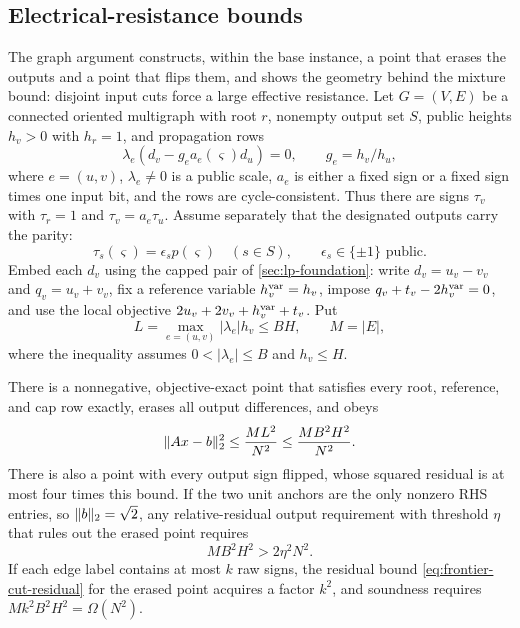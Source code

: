 \subsection{Electrical-resistance bounds}
\label{sec:frontier-electrical}

The graph argument constructs, within the base instance, a point that
erases the outputs and a point that flips them, and shows the geometry behind the mixture bound: disjoint input
cuts force a large effective resistance.  Let
\(G=(V,E)\) be a connected oriented multigraph with root \(r\), nonempty
output set \(S\), public heights \(h_v>0\) with \(h_r=1\), and propagation
rows
\begin{equation}
 \lambda_e(d_v-g_ea_e(\varsigma)d_u)=0,
 \qquad g_e=h_v/h_u,
 \label{eq:frontier-signed-edge}
\end{equation}
where \(e=(u,v)\), \(\lambda_e\neq0\) is a public scale, \(a_e\) is either a
fixed sign or a fixed sign times one input bit, and the rows are
cycle-consistent.  Thus there are signs \(\tau_v\) with
\(\tau_r=1\) and \(\tau_v=a_e\tau_u\).  Assume separately that the
designated outputs carry the parity:
\begin{equation}
 \tau_s(\varsigma)=\epsilon_s p(\varsigma)
 \quad(s\in S),\qquad \epsilon_s\in\{\pm1\}\text{ public}.
 \label{eq:frontier-cut-output-parity}
\end{equation}
Embed each \(d_v\) using the capped pair of
\cref{sec:lp-foundation}: write \(d_v=u_v-v_v\) and
\(q_v=u_v+v_v\), fix a reference variable \(h_v^{\rm var}=h_v\), impose
\(q_v+t_v-2h_v^{\rm var}=0\), and use the local objective
\(2u_v+2v_v+h_v^{\rm var}+t_v\).  Put
\[
 L=\max_{e=(u,v)}|\lambda_e|h_v\leq BH,
 \qquad M=|E|,
\]
where the inequality assumes \(0<|\lambda_e|\leq B\) and \(h_v\leq H\).

\begin{theorem}
\label{thm:frontier-cut-resistance}
There is a nonnegative, objective-exact point that satisfies every root,
reference, and cap row exactly, erases all output differences, and obeys
\begin{equation}
 \lVert Ax-b\rVert_2^2\leq\frac{ML^2}{N^2}
 \leq\frac{MB^2H^2}{N^2}.
 \label{eq:frontier-cut-residual}
\end{equation}
There is also a point with every output sign flipped, whose squared residual
is at most four times this bound.  If the two unit anchors are the only
nonzero RHS entries, so \(\lVert b\rVert_2=\sqrt2\), any relative-residual output requirement
with threshold \(\eta\) that rules out the erased point requires
\begin{equation}
 MB^2H^2>2\eta^2N^2.
 \label{eq:frontier-cut-product}
\end{equation}
If each edge label contains at most \(k\) raw signs, the residual bound
\eqref{eq:frontier-cut-residual} for the erased point acquires a factor
\(k^2\), and soundness requires \(Mk^2B^2H^2=\Omega(N^2)\).
\end{theorem}

